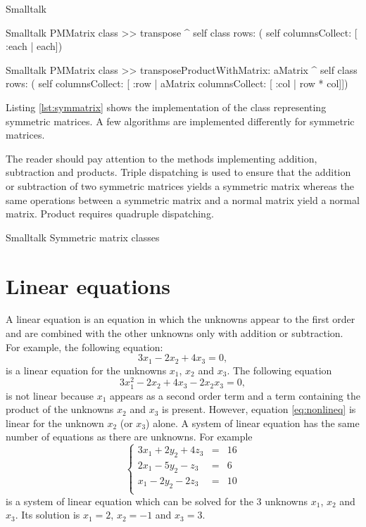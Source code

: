 \begin{displaycode}{Smalltalk}
\begin{displaycode}{Smalltalk}
PMMatrix class >> transpose
    ^ self class rows: ( self columnsCollect: [ :each | each])
\end{displaycode}

\begin{displaycode}{Smalltalk}
PMMatrix class >> transposeProductWithMatrix: aMatrix
    ^ self class rows: ( self columnsCollect: [ :row | aMatrix 
                                 columnsCollect: [ :col | row * col]])
\end{displaycode}

Listing \ref{lst:symmatrix} shows the implementation of the class
 representing symmetric matrices. A few
algorithms are implemented differently for symmetric matrices.

The reader should pay attention to the methods implementing
addition, subtraction and products. Triple dispatching is used to
ensure that the addition or subtraction of two symmetric matrices
yields a symmetric matrix whereas the same operations between a
symmetric matrix and a normal matrix yield a normal matrix.
Product requires quadruple dispatching.

\begin{listing}[label=lst:symatrix]{Smalltalk}
{Symmetric matrix classes}
%
\end{listing}

\section{Linear equations}
\label{sec:lineqs} A linear equation is an equation in which the
unknowns appear to the first order and are combined with the other
unknowns only with addition or subtraction. For example, the
following equation:
\begin{equation}
  3x_1-2x_2+4x_3=0,
\end{equation}
is a linear equation for the unknowns $x_1$, $x_2$ and $x_3$. The
following equation
\begin{equation}
\label{eq:nonlineq}
  3x_1^2-2x_2+4x_3 - 2 x_2 x_3=0,
\end{equation}
is not linear because $x_1$ appears as a second order term and a
term containing the product of the unknowns $x_2$ and $x_3$ is
present. However, equation \ref{eq:nonlineq} is linear for the
unknown $x_2$ (or $x_3$) alone. A system of linear equation has
the same number of equations as there are unknowns. For example
\begin{equation}
\label{eq:lineqex}
  \left\{
  \begin{array}{lcr}
  3x_1+2y_2+4z_3&=&16\\
  2x_1-5y_2-z_3&=&6\\
  x_1-2y_2-2z_3&=&10\\
\end{array}\right.
\end{equation}
is a system of linear equation which can be solved for the 3
unknowns $x_1$, $x_2$ and $x_3$. Its solution is $x_1=2$, $x_2=-1$
and $x_3=3$.


\end{displaycode}
